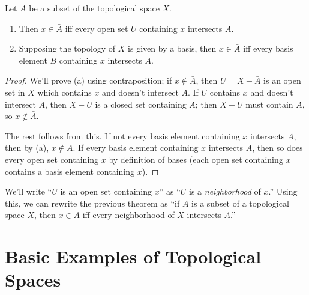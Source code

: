 \documentclass[10pt]{report}
\begin{document}
\begin{theorem}
  Let $A$ be a subset of the topological space $X$.
  \begin{enumerate}[label={(\alph*)}]
    \item Then $x \in \bar A$ iff every open set $U$ containing $x$ intersects $A$.
    \item Supposing the topology of $X$ is given by a basis, then $x \in \bar A$ iff every basis element $B$ containing $x$ intersects $A$.
  \end{enumerate}
\end{theorem}
\begin{proof}
  We'll prove (a) using contraposition;
  if $x \notin \bar{A}$, then $U = X-\bar{A}$ is an open set in $X$ which contains $x$ and doesn't intersect $A$.
  If $U$ contains $x$ and doesn't intersect $\bar{A}$, then $X - U$ is a closed set containing $A$; then $X - U$ must contain $\bar A$, so $x \notin \bar A$.

  The rest follows from this.
  If not every basis element containing $x$ intersects $A$, then by (a), $x \notin \bar A$.
  If every basis element containing $x$ intersects $\bar A$, then so does every open set containing $x$ by definition of bases (each open set containing $x$ contains a basis element containing $x$).
\end{proof}

We'll write ``$U$ is an open set containing $x$'' as ``$U$ is a \emph{neighborhood} of $x$.''
Using this, we can rewrite the previous theorem as ``if $A$ is a subset of a topological space $X$, then $x \in \bar{A}$ iff every neighborhood of $X$ intersects $A$.''
\section{Basic Examples of Topological Spaces}
\end{document}
